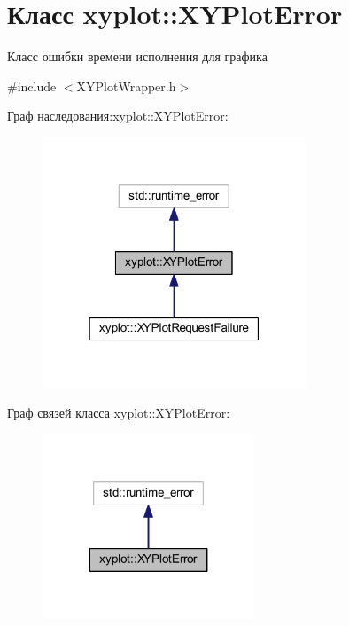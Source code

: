 \hypertarget{classxyplot_1_1_x_y_plot_error}{\section{Класс xyplot\-:\-:X\-Y\-Plot\-Error}
\label{classxyplot_1_1_x_y_plot_error}
}


Класс ошибки времени исполнения для графика  




{\ttfamily \#include $<$X\-Y\-Plot\-Wrapper.\-h$>$}



Граф наследования\-:xyplot\-:\-:X\-Y\-Plot\-Error\-:\nopagebreak
\begin{figure}[H]
\begin{center}
\leavevmode
\includegraphics[width=223pt]{classxyplot_1_1_x_y_plot_error__inherit__graph}
\end{center}
\end{figure}


Граф связей класса xyplot\-:\-:X\-Y\-Plot\-Error\-:\nopagebreak
\begin{figure}[H]
\begin{center}
\leavevmode
\includegraphics[width=179pt]{classxyplot_1_1_x_y_plot_error__coll__graph}
\end{center}
\end{figure}
